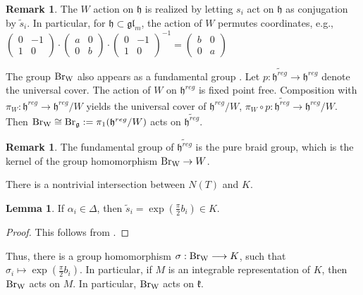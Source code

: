 \documentclass[10pt]{amsart}
\numberwithin{equation}{section}
\theoremstyle{definition}
\newtheorem{lemma}[theorem]{Lemma}
\newtheorem{remark}[theorem]{Remark}
\let\tilde=\widetilde
\newcommand{\glm}{\mathfrak{gl}_{m}}
\newcommand{\Br}{\mathrm{Br}}
\DeclareMathOperator{\BrW}{{\rm Br}_{W}}
\newcommand{\g}{\mathfrak{g}}
\newcommand{\h}{\mathfrak{h}}
\newcommand{\kompact}{\mathfrak{k}}
\begin{document}
\begin{remark}\label{rem:Wactiononh-permutescoords}
    The $W$ action on $\h$ is realized by letting $s_i$ act on $\h$ as conjugation by $\tilde{s}_i$. In particular, for $\h\subset \glm$, the action of $W$ permutes coordinates, e.g.,
    $\begin{pmatrix}
    0 & -1\\
    1 & 0
\end{pmatrix}\cdot
\begin{pmatrix}
    a & 0\\
    0 & b
\end{pmatrix}\cdot
\begin{pmatrix}
    0 & -1\\
    1 & 0
\end{pmatrix}^{-1}=
\begin{pmatrix}
    b & 0\\
    0 & a
\end{pmatrix}$ 
\end{remark}

The group $\BrW$ also appears as a fundamental group \cite{MR293615}. Let $p:\tilde{\h^{reg}}\rightarrow \h^{reg}$ denote the universal cover. The action of $W$ on $\h^{reg}$ is fixed point free. Composition with $\pi_W:\h^{reg}\rightarrow \h^{reg}/W$ yields the universal cover of $\h^{reg}/W$, $\pi_W\circ p:\tilde{\h^{reg}}\rightarrow \h^{reg}/W$. Then $\BrW\cong \Br_{\g}:=\pi_1(\h^{reg}/W)$ acts on $\tilde{\h^{reg}}$.

\begin{remark}
The fundamental group of $\tilde{\h^{reg}}$ is the pure braid group, which is the kernel of the group homomorphism $\BrW\rightarrow W$.
\end{remark}

There is a nontrivial intersection between $N(T)$ and $K$.

\begin{lemma}\label{lift_of_braid_gp_gens}
    If $\alpha_i\in \Delta$, then $\tilde{s}_{i} = \exp(\frac{\pi}{2}b_{i})\in K$.
\end{lemma}
\begin{proof}
This follows from \cite[Proposition 3.5]{MR4983792}.
\end{proof}

Thus, there is a group homomorphism $\sigma:\BrW\longrightarrow K$, such that $\sigma_{i}\mapsto \exp(\frac{\pi}{2}b_{i})$. In particular, if $M$ is an integrable representation of $K$, then $\BrW$ acts on $M$. In particular, $\BrW$ acts on $\kompact$.
\end{document}

